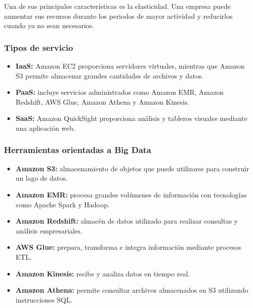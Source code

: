 Una de sus principales características es la elasticidad. Una empresa puede
aumentar sus recursos durante los periodos de mayor actividad y reducirlos
cuando ya no sean necesarios.

\subsubsection*{Tipos de servicio}

\begin{itemize}
    \item \textbf{IaaS:} Amazon EC2 proporciona servidores virtuales, mientras
    que Amazon S3 permite almacenar grandes cantidades de archivos y datos.
    
    \item \textbf{PaaS:} incluye servicios administrados como Amazon EMR,
    Amazon Redshift, AWS Glue, Amazon Athena y Amazon Kinesis.
    
    \item \textbf{SaaS:} Amazon QuickSight proporciona análisis y tableros
    visuales mediante una aplicación web.
\end{itemize}

\subsubsection*{Herramientas orientadas a Big Data}

\begin{itemize}
    \item \textbf{Amazon S3:} almacenamiento de objetos que puede utilizarse
    para construir un lago de datos.
    
    \item \textbf{Amazon EMR:} procesa grandes volúmenes de información con
    tecnologías como Apache Spark y Hadoop.
    
    \item \textbf{Amazon Redshift:} almacén de datos utilizado para realizar
    consultas y análisis empresariales.
    
    \item \textbf{AWS Glue:} prepara, transforma e integra información mediante
    procesos ETL.
    
    \item \textbf{Amazon Kinesis:} recibe y analiza datos en tiempo real.
    
    \item \textbf{Amazon Athena:} permite consultar archivos almacenados en S3
    utilizando instrucciones SQL.
\end{itemize}

